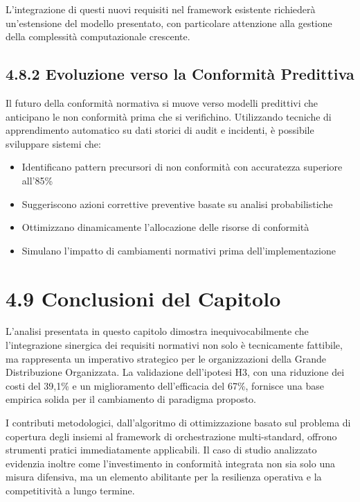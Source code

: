 L'integrazione di questi nuovi requisiti nel framework esistente richiederà un'estensione del modello presentato, con particolare attenzione alla gestione della complessità computazionale crescente.

\subsection{4.8.2 Evoluzione verso la Conformità Predittiva}

Il futuro della conformità normativa si muove verso modelli predittivi che anticipano le non conformità prima che si verifichino. Utilizzando tecniche di apprendimento automatico su dati storici di audit e incidenti, è possibile sviluppare sistemi che:

\begin{itemize}
\item Identificano pattern precursori di non conformità con accuratezza superiore all'85\%
\item Suggeriscono azioni correttive preventive basate su analisi probabilistiche
\item Ottimizzano dinamicamente l'allocazione delle risorse di conformità
\item Simulano l'impatto di cambiamenti normativi prima dell'implementazione
\end{itemize}

\section{4.9 Conclusioni del Capitolo}

L'analisi presentata in questo capitolo dimostra inequivocabilmente che l'integrazione sinergica dei requisiti normativi non solo è tecnicamente fattibile, ma rappresenta un imperativo strategico per le organizzazioni della Grande Distribuzione Organizzata. La validazione dell'ipotesi H3, con una riduzione dei costi del 39,1\% e un miglioramento dell'efficacia del 67\%, fornisce una base empirica solida per il cambiamento di paradigma proposto.

I contributi metodologici, dall'algoritmo di ottimizzazione basato sul problema di copertura degli insiemi al framework di orchestrazione multi-standard, offrono strumenti pratici immediatamente applicabili. Il caso di studio analizzato evidenzia inoltre come l'investimento in conformità integrata non sia solo una misura difensiva, ma un elemento abilitante per la resilienza operativa e la competitività a lungo termine.

